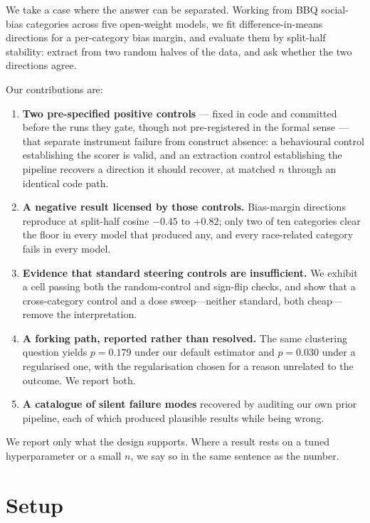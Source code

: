 \documentclass{article}
\begin{document}
We take a case where the answer can be separated. Working from BBQ
\citep{parrish2022bbq} social-bias categories across five open-weight models, we
fit difference-in-means directions for a per-category bias margin, and evaluate
them by split-half stability: extract from two random halves of the data, and
ask whether the two directions agree.

Our contributions are:

\begin{enumerate}
\item \textbf{Two pre-specified positive controls} --- fixed in code and
committed before the runs they gate, though not pre-registered in the formal
sense --- that separate instrument failure from construct absence: a behavioural
control establishing the scorer is valid, and an extraction control establishing
the pipeline recovers a direction it should recover, at matched $n$ through an
identical code path.
\item \textbf{A negative result licensed by those controls.} Bias-margin
directions reproduce at split-half cosine $-0.45$ to $+0.82$; only two of ten
categories clear the floor in every model that produced any, and every
race-related category fails in every model.
\item \textbf{Evidence that standard steering controls are insufficient.} We
exhibit a cell passing both the random-control and sign-flip checks, and show
that a cross-category control and a dose sweep---neither standard, both
cheap---remove the interpretation.
\item \textbf{A forking path, reported rather than resolved.} The same
clustering question yields $p=0.179$ under our default estimator and $p=0.030$
under a regularised one, with the regularisation chosen for a reason unrelated
to the outcome. We report both.
\item \textbf{A catalogue of silent failure modes} recovered by auditing our own
prior pipeline, each of which produced plausible results while being wrong.
\end{enumerate}

We report only what the design supports. Where a result rests on a tuned
hyperparameter or a small $n$, we say so in the same sentence as the number.

\section{Setup}
\end{document}
